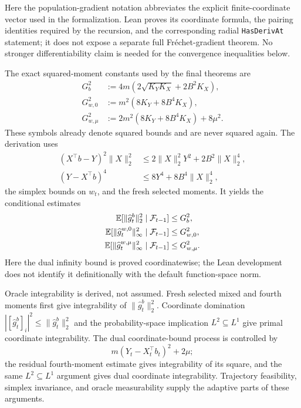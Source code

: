 Here the population-gradient notation abbreviates the explicit
finite-coordinate vector used in the formalization.  Lean proves its
coordinate formula, the pairing identities required by the recursion, and
the corresponding radial \texttt{HasDerivAt} statement; it does not expose a
separate full Fr\'echet-gradient theorem.  No stronger differentiability
claim is needed for the convergence inequalities below.

The exact squared-moment constants used by the final theorems are
\begin{align}
  G_b^2
  &:=4m\left(2\sqrt{K_YK_X}+2B^2K_X\right),
  \label{eq:primal-moment-constant}\\
  G_{w,0}^2
  &:=m^2\left(8K_Y+8B^4K_X\right),
  \label{eq:unpenalized-dual-moment-constant}\\
  G_{w,\mu}^2
  &:=2m^2\left(8K_Y+8B^4K_X\right)+8\mu^2.
  \label{eq:penalized-dual-moment-constant}
\end{align}
These symbols already denote squared bounds and are never squared again.
The derivation uses
\begin{align*}
  (X^\top b-Y)^2\|X\|_2^2
  &\le2\|X\|_2^2Y^2+2B^2\|X\|_2^4,\\
  (Y-X^\top b)^4
  &\le8Y^4+8B^4\|X\|_2^4,
\end{align*}
the simplex bounds on $w_t$, and the fresh selected moments.  It yields the
conditional estimates
\begin{align}
  \mathbb{E}[\|\widehat g_t^b\|_2^2\mid\mathcal F_{t-1}]&\le G_b^2,\\
  \mathbb{E}[\|\widehat g_t^{w,0}\|_\infty^2\mid\mathcal F_{t-1}]&\le G_{w,0}^2,\\
  \mathbb{E}[\|\widehat g_t^{w,\mu}\|_\infty^2\mid\mathcal F_{t-1}]&\le G_{w,\mu}^2.
  \label{eq:derived-oracle-bounds}
\end{align}
Here the dual infinity bound is proved coordinatewise; the Lean development
does not identify it definitionally with the default function-space norm.

Oracle integrability is derived, not assumed.  Fresh selected mixed and fourth
moments first give integrability of
$\|\widehat g_t^b\|_2^2$.  Coordinate domination
$|[\widehat g_t^b]_i|^2\le\|\widehat g_t^b\|_2^2$ and the probability-space
implication $L^2\subseteq L^1$ give primal coordinate integrability.  The
dual coordinate-bound process is controlled by
\[
  m(Y_t-X_t^\top b_t)^2+2\mu;
\]
the residual fourth-moment estimate gives integrability of its square, and
the same $L^2\subseteq L^1$ argument gives dual coordinate integrability.
Trajectory feasibility, simplex invariance, and oracle measurability supply
the adaptive parts of these arguments.

